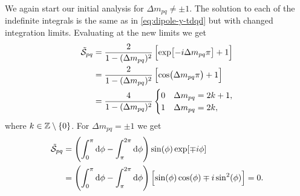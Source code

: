         We again start our initial analysis for $\Delta m_{pq} \neq \pm 1$.
        The solution to each of the indefinite integrals is the same as in
        \autoref{eq:dipole-y-tdqd} but with changed integration limits.
        Evaluating at the new limits we get
        \begin{align}
            \tilde{\mathcal{S}}_{pq}
            &=
            \frac{2}{1 - (\Delta m_{pq})^2}
            \left[ 
                \exp[-i\Delta m_{pq} \pi]
                + 1
             \right]
            \\
            &= \frac{2}{1 - (\Delta m_{pq})^2}
            \left[ 
                \cos(\Delta m_{pq} \pi)
                + 1
             \right]
            \\
            &=
            \frac{4}{1 - (\Delta m_{pq})^2}
            \begin{cases}
                0 & \Delta m_{pq} = 2k + 1, \\
                1 & \Delta m_{pq} = 2k,
            \end{cases}
        \end{align}
        where $k \in \mathbb{Z} \setminus \left\{ 0 \right\}$.
        For $\Delta m_{pq} = \pm 1$ we get
        \begin{align}
            \tilde{\mathcal{S}}_{pq}
            &= \left( 
                \int_{0}^{\pi} \dd \phi
                - \int_{\pi}^{2\pi} \dd \phi
             \right)
            \sin(\phi) \exp[\mp i \phi]
            \\
            &= \left( 
                \int_{0}^{\pi} \dd \phi
                - \int_{\pi}^{2\pi} \dd \phi
             \right)
            \left[ 
                \sin(\phi)\cos(\phi)
                \mp i\sin^2(\phi)
             \right]
            = 0.
        \end{align}
